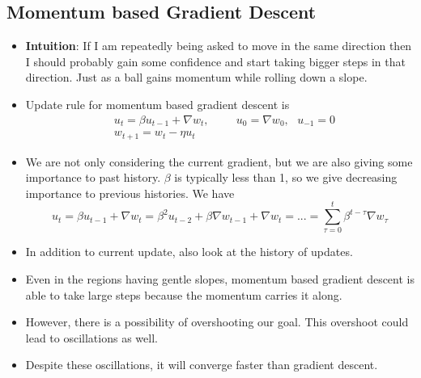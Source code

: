 \documentclass[a4paper]{article}
\begin{document}
\subsection{Momentum based Gradient Descent}
\begin{itemize}
    \item \textbf{Intuition}: If I am repeatedly being asked to move in the same direction then I should probably gain some confidence and start taking bigger steps in that direction. Just as a ball gains momentum while rolling down a slope.
    \item Update rule for momentum based gradient descent is
    \begin{equation*}
        \begin{split}
            &u_t=\beta u_{t-1}+\nabla w_t,\hspace{1cm}u_0=\nabla w_0,\text{ }u_{-1}=0\\
            &w_{t+1}=w_t-\eta u_t
        \end{split}
    \end{equation*}
    \item We are not only considering the current gradient, but we are also giving some importance to past history. $\beta$ is typically less than 1, so we give decreasing importance to previous histories. We have
    \begin{equation*}
        u_t = \beta u_{t-1}+\nabla w_t = \beta^2u_{t-2}+\beta \nabla w_{t-1}+\nabla w_t = ... = \sum_{\tau=0}^t\beta^{t-\tau}\nabla w_\tau
    \end{equation*}
    \item In addition to current update, also look at the history of updates.
    \item Even in the regions having gentle slopes, momentum based gradient descent is able to take large steps because the momentum carries it along.
    \item However, there is a possibility of overshooting our goal. This overshoot could lead to oscillations as well.
    \item Despite these oscillations, it will converge faster than gradient descent.
\end{itemize}
\end{document}
